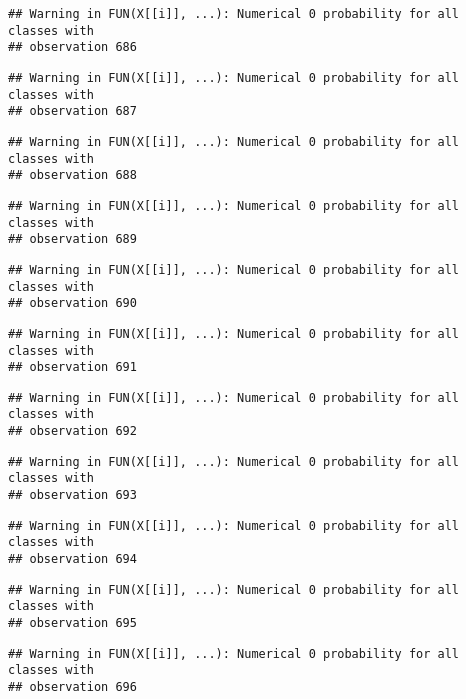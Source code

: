 \documentclass[
]{article}
\begin{document}
\begin{verbatim}
## Warning in FUN(X[[i]], ...): Numerical 0 probability for all classes with
## observation 686
\end{verbatim}

\begin{verbatim}
## Warning in FUN(X[[i]], ...): Numerical 0 probability for all classes with
## observation 687
\end{verbatim}

\begin{verbatim}
## Warning in FUN(X[[i]], ...): Numerical 0 probability for all classes with
## observation 688
\end{verbatim}

\begin{verbatim}
## Warning in FUN(X[[i]], ...): Numerical 0 probability for all classes with
## observation 689
\end{verbatim}

\begin{verbatim}
## Warning in FUN(X[[i]], ...): Numerical 0 probability for all classes with
## observation 690
\end{verbatim}

\begin{verbatim}
## Warning in FUN(X[[i]], ...): Numerical 0 probability for all classes with
## observation 691
\end{verbatim}

\begin{verbatim}
## Warning in FUN(X[[i]], ...): Numerical 0 probability for all classes with
## observation 692
\end{verbatim}

\begin{verbatim}
## Warning in FUN(X[[i]], ...): Numerical 0 probability for all classes with
## observation 693
\end{verbatim}

\begin{verbatim}
## Warning in FUN(X[[i]], ...): Numerical 0 probability for all classes with
## observation 694
\end{verbatim}

\begin{verbatim}
## Warning in FUN(X[[i]], ...): Numerical 0 probability for all classes with
## observation 695
\end{verbatim}

\begin{verbatim}
## Warning in FUN(X[[i]], ...): Numerical 0 probability for all classes with
## observation 696
\end{verbatim}
\end{document}
